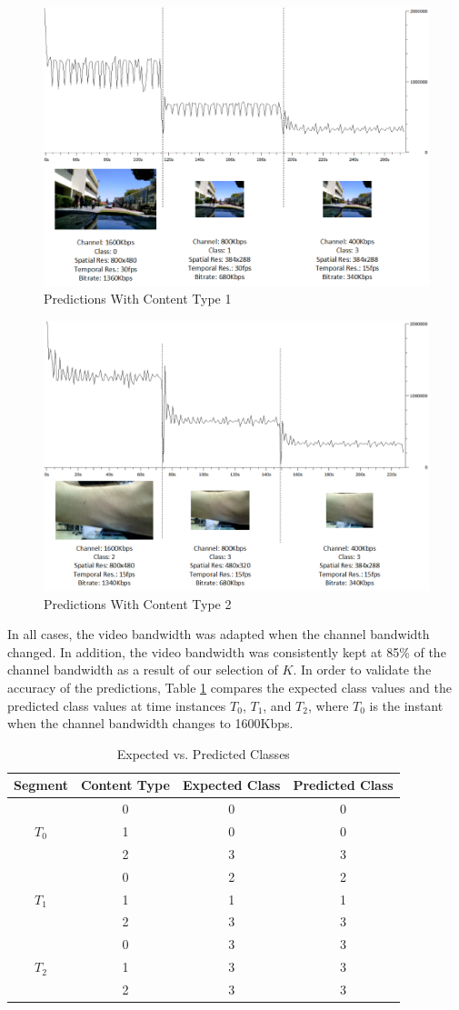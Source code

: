 \documentclass[a4paper,12pt]{article}
\begin{document}
\begin{figure}[h]
\centering
\includegraphics[width=0.5\linewidth]{TrainingExperimentSports.png}
\caption{Predictions With Content Type 1}
\label{fig:Sports}
\end{figure}
\begin{figure}[h]
\centering
\includegraphics[width=0.5\linewidth]{TrainingExperimentMedical.png}
\caption{Predictions With Content Type 2}
\label{fig:Medical}
\end{figure}
In all cases, the video bandwidth was adapted when the channel bandwidth changed. In addition, the video bandwidth was consistently kept at 85\% of the channel bandwidth as a result of our selection of $K$. In order to validate the accuracy of the predictions, Table \ref{tab:PredictedClasses} compares the expected class values and the predicted class values at time instances $T_0$, $T_1$, and $T_2$, where $T_0$ is the instant when the channel bandwidth changes to 1600Kbps.
\begin{table} [h]
\caption{Expected vs. Predicted Classes}
\label{tab:PredictedClasses}
\begin{tabular}{c|c|c|c}
\textbf{Segment}&\textbf{Content Type}&\textbf{Expected Class}&\textbf{Predicted Class}\\
\hline
&0&0&0\\
$T_0$&1&0&0\\
&2&3&3\\
\hline
&0&2&2\\
$T_1$&1&1&1\\
&2&3&3\\
\hline
&0&3&3\\
$T_2$&1&3&3\\
&2&3&3\\
\end{tabular}
\end{table} 
\end{document}
